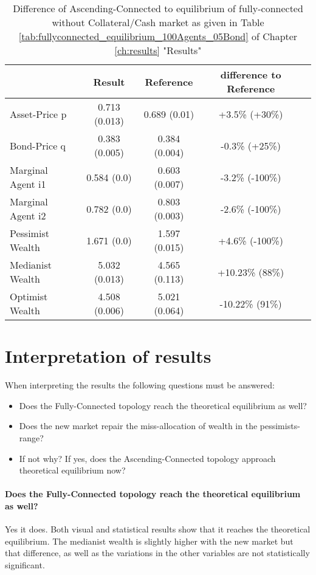 \documentclass[Bachelorarbeit.tex]{subfiles}
\begin{document}
\begin{table}[H]
	\caption{Difference of Ascending-Connected to equilibrium of fully-connected without Collateral/Cash market as given in Table \ref{tab:fullyconnected_equilibrium_100Agents_05Bond} of Chapter \ref{ch:results} "Results"}
	\centering
	\begin{tabular} { l c c c r }
		& Result & Reference & difference to Reference \\
		\hline
		Asset-Price p & 0.713 (0.013) & 0.689 (0.01) & +3.5\% (+30\%) \\
		Bond-Price q & 0.383 (0.005) & 0.384 (0.004) & -0.3\% (+25\%) \\
		Marginal Agent i1 & 0.584 (0.0) & 0.603 (0.007) & -3.2\% (-100\%) \\
		Marginal Agent i2 & 0.782 (0.0) & 0.803 (0.003) & -2.6\% (-100\%) \\
		\hline
		Pessimist Wealth & 1.671 (0.0) & 1.597 (0.015) & +4.6\% (-100\%) \\
		Medianist Wealth & 5.032 (0.013) & 4.565 (0.113) & +10.23\% (88\%) \\
		Optimist Wealth & 4.508 (0.006) & 5.021 (0.064) & -10.22\% (91\%) \\
		\hline
	\end{tabular}
\end{table} 

\section{Interpretation of results}
When interpreting the results the following questions must be answered:

\begin{itemize}
\item Does the Fully-Connected topology reach the theoretical equilibrium as well?
\item Does the new market repair the miss-allocation of wealth in the pessimists-range?
\item If not why? If yes, does the Ascending-Connected topology approach theoretical equilibrium now?
\end{itemize}

\paragraph{Does the Fully-Connected topology reach the theoretical equilibrium as well?}
Yes it does. Both visual and statistical results show that it reaches the theoretical equilibrium. The medianist wealth is slightly higher with the new market but that difference, as well as the variations in the other variables are not statistically significant.
\end{document}
